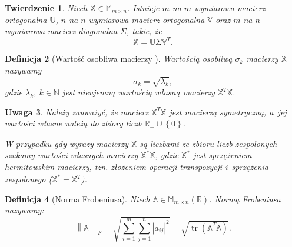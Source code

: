 \documentclass[12pt,a4paper]{report}
\newtheorem{df}{Definicja}[chapter]
\newtheorem{tw}[df]{Twierdzenie}
\newtheorem{uwaga}[df]{Uwaga}
\newcommand{\set}[1]{\left\lbrace {#1} \right\rbrace}
\newcommand{\setR}{\mathbb{R}}
\newcommand{\setN}{\mathbb{N}}
\newcommand{\norm}[2][]{\left\| {#2} \right\|_{#1}}
\newcommand{\tr}[1]{\operatorname{tr}\left({#1} \right)}
\begin{document}
\begin{tw}{\citep{tsvdalra}}
Niech $\mathbb{X} \in \mathbb{M}_{m \times n} $. Istnieje $m$ na $m$ wymiarowa macierz ortogonalna $\mathbb{U}$, $n$ na $n$ wymiarowa macierz ortogonalna $\mathbb{V}$ oraz $m$ na $n$ wymiarowa macierz diagonalna $\Sigma$, takie, że
$$
\mathbb{X} = \mathbb{U} \Sigma \mathbb{V}^T.
$$
\end{tw}

\begin{df}[Wartość osobliwa macierzy ]
Wartością osobliwą $\sigma_k$ macierzy $\mathbb{X}$ nazywamy
$$
\sigma_k = \sqrt{\lambda_k},
$$
gdzie $\lambda_k, \: k \in \setN$ jest nieujemną wartością własną macierzy $\mathbb{X}^T \mathbb{X}$.
\end{df}
\begin{uwaga}
Należy zauważyć, że macierz $\mathbb{X}^T \mathbb{X}$ jest macierzą symetryczną, a~jej wartości własne należą do zbiory liczb $\setR_{+} \cup \set{0}$.

W przypadku gdy wyrazy macierzy $\mathbb{X}$ są liczbami ze zbioru liczb zespolonych szukamy wartości własnych macierzy $\mathbb{X}^*\mathbb{X}$, gdzie $\mathbb{X}^*$ jest sprzężeniem hermitowskim macierzy, tzn. złożeniem operacji transpozycji i~sprzężenia zespolonego ($\mathbb{X}^* = \overline{\mathbb{X}^T}$).
\end{uwaga}

\begin{df}[Norma Frobeniusa{\citep{ulafiir}}] %
Niech $\mathbb{A}\in \mathbb{M}_{m\times n}(\mathbb{R})$. Normą Frobeniusa nazywamy:
$$
{\norm{\mathbb{A}}}_F = \sqrt{\sum_{i=1}^m \sum_{j=1}^n |a_{ij}|^2} = \sqrt{\tr{\mathbb{A}^T \mathbb{A}}}.
$$
\end{df}
\end{document}
